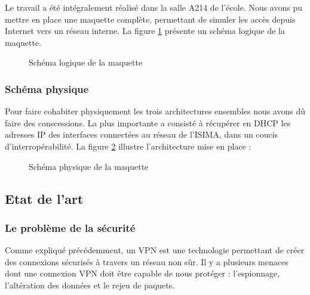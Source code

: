 Le travail a été intégralement réalisé dans la salle A214 de l'école. Nous avons pu mettre en place une maquette complète, permettant de simuler les accès depuis Internet vers un réseau interne. La figure \ref{schema-logique-maquette} présente un schéma logique de la maquette.

\begin{figure}[H]
	\begin{center}
	\end{center}
	\caption{Schéma logique de la maquette}
	\label{schema-logique-maquette}
\end{figure}

\subsubsection{Schéma physique}

Pour faire cohabiter physiquement les trois architectures ensembles nous avons dû faire des conscessions. La plus importante a consisté à récupérer en DHCP les adresses IP des interfaces connectées au réseau de l'ISIMA, dans un coucis d'interropérabilité. La figure \ref{schema-physique-maquette} illustre l'architecture mise en place :

\begin{figure}[H]
	\begin{center}
	\end{center}
	\caption{Schéma physique de la maquette}
	\label{schema-physique-maquette}
\end{figure}

\subsection{Etat de l'art}

\subsubsection{Le problème de la sécurité}

Comme expliqué précédemment, un VPN est une technologie permettant de créer des connexions sécurisés à travers un réseau non sûr. Il y a plusieurs menaces dont une connexion VPN doit être capable de nous protéger : l'espionnage, l'altération des données et le rejeu de paquets.

